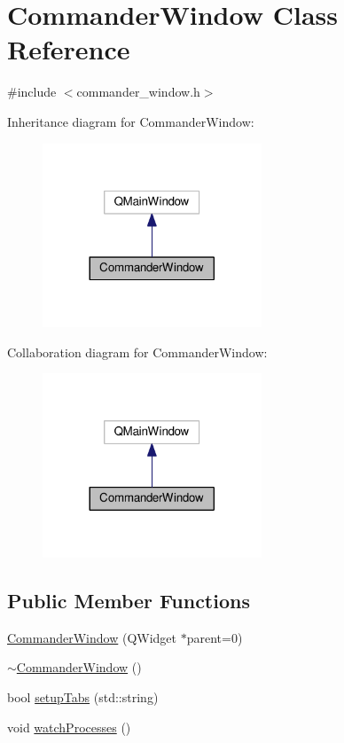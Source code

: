 \hypertarget{classCommanderWindow}{}\section{Commander\+Window Class Reference}
\label{classCommanderWindow}


{\ttfamily \#include $<$commander\+\_\+window.\+h$>$}



Inheritance diagram for Commander\+Window\+:
\nopagebreak
\begin{figure}[H]
\begin{center}
\leavevmode
\includegraphics[width=185pt]{classCommanderWindow__inherit__graph}
\end{center}
\end{figure}


Collaboration diagram for Commander\+Window\+:
\nopagebreak
\begin{figure}[H]
\begin{center}
\leavevmode
\includegraphics[width=185pt]{classCommanderWindow__coll__graph}
\end{center}
\end{figure}
\subsection*{Public Member Functions}
\begin{DoxyCompactItemize}
\item 
\hyperlink{classCommanderWindow_a722cab557ae14b97b23fb6366be5d21a}{Commander\+Window} (Q\+Widget $\ast$parent=0)
\item 
\hyperlink{classCommanderWindow_a4853aef2189ab44a52d6f07f09b2fa3b}{$\sim$\+Commander\+Window} ()
\item 
bool \hyperlink{classCommanderWindow_ac66b82e4768cd74a68c3e1cb0cf03dd9}{setup\+Tabs} (std\+::string)
\item 
void \hyperlink{classCommanderWindow_a0dccc9dc555a2f2f271ecda8634e4a60}{watch\+Processes} ()
\end{DoxyCompactItemize}
